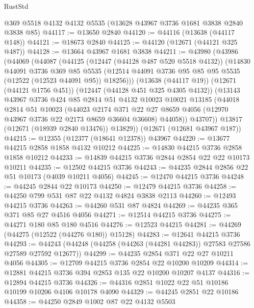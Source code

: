 \begin{lexlean}{RustStd}
\begin{coremodule}
    @369
    @5518
    @4132
    @4132
    @5535
    (@13628 @43967 @3736 @1681 @3838 @2840 @3838 @85)
@44117 := @13650 @2840
@44120 := @44116 (@13638 (@44117 @148))
@44121 := @18673 @2840
@44125 := @44120 (@12671 (@44121 @325 @487))
@44128 := @13664 @43967 @1681 @3838
@44211 := @43980
    (@43986
      (@44069
        (@44087
          (@44125
            (@12447 (@44128 @487 @520 @5518 @4132))
            (@14830
              @44091
              @3736
              @369
              @85
              @5535
              (@12514 @44091 @3736 @95 @85 @95 @5535 (@12522 (@12523 @44091 @95)) @18256)))
          (@13638 (@44117 @19))
          (@12671 (@44121 @1756 @451))
          (@12447 (@44128 @451 @325 @4305 @4132))
          (@13143
            @43967
            @3736
            @424
            @85
            @2814
            @51
            @4132
            @10023
            @10021
            @13185
            (@44018
              @2814
              @51
              @10023
              (@44023
                @2174
                @371
                @22
                @27
                @8659
                @4056
                (@12970 @43967 @3736 @22 @2173 @8659 @36604 @36608)
                @44058))
            @43707))
        @13817
        (@12671 (@18939 @2840 @13476))
        @13829))
    (@12671 (@12681 @43967 @187))
@44215 := @12355 (@12377 (@18641 @12378)) @43967
@44220 := @13677 @44215 @2858 @1858 @4132 @10212
@44225 := @14830 @44215 @3736 @2858 @1858 @10212
@44233 := @14839 @44215 @3736 @2844 @2854 @22 @22 @10173 @10211
@44235 := @12502 @44215 @3736
@44243 := @44235 @2844 @2856 @22 @51 @10173 (@4039 @10211 @4056)
@44245 := @12470 @44215 @3736
@44248 := @44245 @2844 @22 @10173
@44250 := @12479 @44215 @3736
@44258 := @44250 @799 @531 @87 @22 @4132 @4824 @3838 @2113
@44260 := @12493 @44215 @3736
@44263 := @44260 @531 @87 @4824
@44269 := @44235 @365 @371 @85 @27 @4516 @4056
@44271 := @12514 @44215 @3736
@44275 := @44271 @180 @85 @180 @4516
@44276 := @12523 @44215
@44281 := @44269 (@44275 (@12522 (@44276 @180)) @15128)
@44283 := @12641 @44215 @3736
@44293 := @44243 (@44248 (@44258 (@44263 (@44281 @44283)) @27583 @27586 @27589 @27592 @12677))
@44299 := @44235 @2854 @371 @22 @27 @10211 @4056
@44305 := @12709 @44215 @3736 @2854 @22 @10200 @10209
@44314 := @12881 @44215 @3736 @394 @2853 @135 @22 @10200 @10207 @4137
@44316 := @12894 @44215 @3736
@44326 := @44316 @2851 @1022 @22 @51 @10186 @10199 @10206 @4106 @10178 @4090
@44329 := @44245 @2851 @22 @10186
@44358 := @44250
    @2849
    @1002
    @87
    @22
    @4132
    @5503

\end{coremodule}
\end{lexlean}
